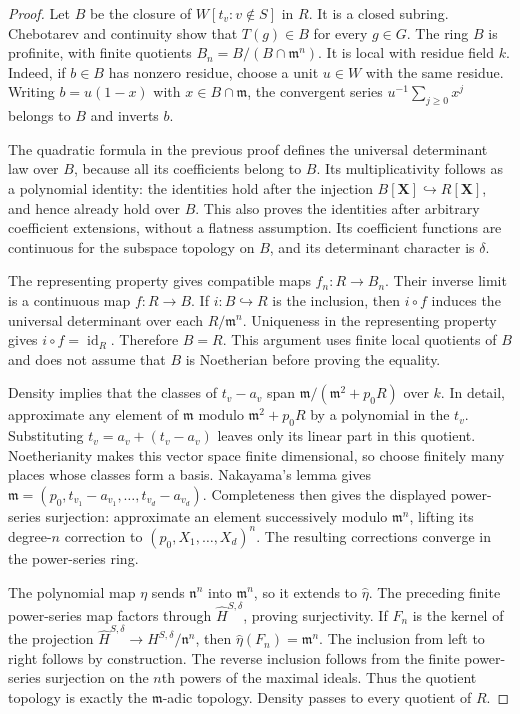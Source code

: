 \begin{proof}
Let $B$ be the closure of $W[t_v:v\notin S]$ in $R$.
It is a closed subring. Chebotarev and continuity show that
$T(g)\in B$ for every $g\in G$.
The ring $B$ is profinite, with finite quotients
$B_n=B/(B\cap\mathfrak m^n)$. It is local with residue field $k$.
Indeed, if $b\in B$ has nonzero residue, choose a unit $u\in W$
with the same residue. Writing $b=u(1-x)$ with
$x\in B\cap\mathfrak m$, the convergent series
$u^{-1}\sum_{j\geq0}x^j$ belongs to $B$ and inverts $b$.

The quadratic formula in the previous proof defines the universal
determinant law over $B$, because all its coefficients belong to $B$.
Its multiplicativity follows as a polynomial identity: the identities
hold after the injection $B[\mathbf X]\hookrightarrow R[\mathbf X]$,
and hence already hold over $B$. This also proves the identities after
arbitrary coefficient extensions, without a flatness assumption.
Its coefficient functions are continuous for the subspace topology
on $B$, and its determinant character is $\delta$.

The representing property gives compatible maps $f_n:R\to B_n$.
Their inverse limit is a continuous map $f:R\to B$.
If $i:B\hookrightarrow R$ is the inclusion, then $i\circ f$
induces the universal determinant over each $R/\mathfrak m^n$.
Uniqueness in the representing property gives
$i\circ f=\operatorname{id}_R$. Therefore $B=R$.
This argument uses finite local quotients of $B$ and does not assume
that $B$ is Noetherian before proving the equality.

Density implies that the classes of $t_v-a_v$ span
$\mathfrak m/(\mathfrak m^2+p_0R)$ over $k$.
In detail, approximate any element of $\mathfrak m$ modulo
$\mathfrak m^2+p_0R$ by a polynomial in the $t_v$. Substituting
$t_v=a_v+(t_v-a_v)$ leaves only its linear part in this quotient.
Noetherianity makes this vector space finite dimensional, so choose
finitely many places whose classes form a basis.
Nakayama's lemma gives
$\mathfrak m=(p_0,t_{v_1}-a_{v_1},\ldots,t_{v_d}-a_{v_d})$.
Completeness then gives the displayed power-series surjection:
approximate an element successively modulo $\mathfrak m^n$, lifting
its degree-$n$ correction to $(p_0,X_1,\ldots,X_d)^n$.
The resulting corrections converge in the power-series ring.

The polynomial map $\eta$ sends $\mathfrak n^n$ into
$\mathfrak m^n$, so it extends to $\widehat\eta$.
The preceding finite power-series map factors through
$\widehat H^{S,\delta}$, proving surjectivity.
If $F_n$ is the kernel of the projection
$\widehat H^{S,\delta}\to H^{S,\delta}/\mathfrak n^n$, then
$\widehat\eta(F_n)=\mathfrak m^n$.
The inclusion from left to right follows by construction. The reverse
inclusion follows from the finite power-series surjection on the
$n$th powers of the maximal ideals. Thus the quotient topology is
exactly the $\mathfrak m$-adic topology.
Density passes to every quotient of $R$.
\end{proof}

